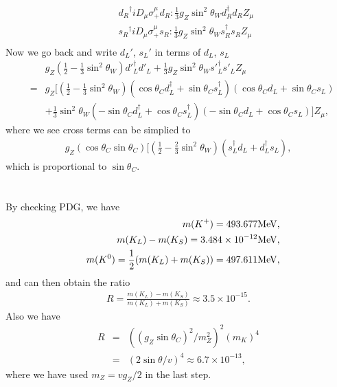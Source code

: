 \documentclass[11pt]{article}
\begin{document}
\begin{itemize}
\begin{eqnarray}
        && {d_R}^\dagger iD_\mu \sigma_+^\mu d_R : \frac{1}{3} g_Z \sin^2\theta_W {d}_R^\dagger d_R Z_\mu \\
        && {s_R}^\dagger iD_\mu \sigma_+^\mu s_R : \frac{1}{3} g_Z \sin^2\theta_W {s}_R^\dagger s_R Z_\mu \\
    \end{eqnarray}
    Now we go back and write $d_L'$, $s_L'$ in terms of $d_L$, $s_L$ 
    \begin{eqnarray}
        &&g_Z(\frac{1}{2}-\frac{1}{3} \sin^2\theta_W){d'}_L^\dagger d'_L + \frac{1}{3} g_Z \sin^2\theta_W {s'}_L^\dagger s'_L Z_\mu \\ &=& g_Z  [(\frac{1}{2}-\frac{1}{3} \sin^2\theta_W) (\cos\theta_C d_L^\dagger + \sin\theta_C s_L^\dagger)(\cos\theta_C d_L + \sin\theta_C s_L) \nonumber \\ &&+\frac{1}{3}\sin^2\theta_W (-\sin\theta_C d_L^\dagger + \cos\theta_C s_L^\dagger) (-\sin\theta_C d_L + \cos\theta_C s_L)] Z_\mu,
    \end{eqnarray}
    where we see cross terms can be simplied to
    \begin{eqnarray}
        g_Z(\cos\theta_C \sin\theta_C)[(\frac{1}{2}-\frac{2}{3} \sin^2\theta_W)(s_L^\dagger d_L+d_L^\dagger s_L) ,
    \end{eqnarray}
    which is proportional to $\sin\theta_C$.
\end{itemize}

\section{ }
By checking PDG, we have
\begin{eqnarray}
    &&m(K^+)=493.677 {\rm MeV}, \\
    &&m(K_L)-m(K_S)= 3.484\times 10^{-12} {\rm MeV}, \\
    &&m(K^0)=\frac{1}{2}(m(K_L)+m(K_S))=497.611 {\rm MeV},
\end{eqnarray}
and can then obtain the ratio
\begin{eqnarray}
    R=\frac{m(K_L)-m(K_S)}{m(K_L)+m(K_S)} \approx 3.5\times 10^{-15}.
\end{eqnarray}
Also we have
\begin{eqnarray}
    R &=& ((g_Z  \sin\theta_C)^2/m_Z^2)^2 (m_K)^4 \\
    &=&(2 \sin\theta /v)^4\approx 6.7 \times 10^{-13},
\end{eqnarray}
where we have used $m_Z=v g_Z/2$ in the last step.
\end{document}
